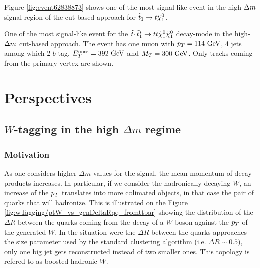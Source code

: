     Figure \ref{fig:event62838873} shows one of the most signal-like event in the
    high-$\Delta m$ signal region of the cut-based approach for $\tilde{t}_1 \rightarrow t \tilde{\chi}_1^0$.
        
    {One of the most signal-like event for the $\tilde{t}_1 \tilde{t}_1^{*} \rightarrow t t \tilde{\chi}_1^0 \tilde{\chi}_1^0$ decay-mode in the high-$\Delta m$ cut-based approach. The event has one muon with $p_T = 114~\text{GeV}$, 4 jets among which 2 $b$-tag, $E_T^\text{miss} = 392~\text{GeV}$ and $M_T = 300 ~\text{GeV}$. Only tracks coming from the primary vertex are shown.}

    \newpage

    \section{Perspectives \label{sec:analysis_perspective}}
        
    \subsection{$W$-tagging in the high $\Delta m$ regime}
        
            \subsubsection{Motivation}

             As one considers higher $\Delta m$ values for the signal, the mean momentum of
             decay products increases. In particular, if we consider the hadronically
             decaying $W$, an increase of the $p_T$ translates into more colimated objects,
             in that case the pair of quarks that will hadronize. This is illustrated on
             the Figure \ref{fig:wTagging/ptW_vs_genDeltaRqq_fromttbar} showing the 
             distribution of the $\Delta R$ between the
             quarks coming from the decay of a $W$ boson against the $p_T$ of the generated
             $W$. In the situation were the $\Delta R$ between the quarks approaches the 
             size parameter used by the standard clustering algorithm (i.e. $\Delta R 
             \sim 0.5$), only one big jet gets reconstructed instead of two smaller ones.
             This topology is refered to as boosted hadronic $W$. 
            

